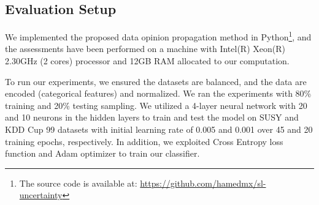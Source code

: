 \subsection{Evaluation Setup}
We implemented the proposed data opinion propagation method in Python\footnote{The source code is available at: \url{https://github.com/hamedmx/sl-uncertainty}}, and the assessments have been performed on a machine with Intel(R) Xeon(R) 2.30GHz (2 cores) processor and 12GB RAM allocated to our computation. 

To run our experiments, we ensured the datasets are balanced, and the data are encoded (categorical features) and normalized. We ran the experiments with 80\% training and 20\% testing sampling. We utilized a 4-layer neural network with 20 and 10 neurons in the hidden layers to train and test the model on SUSY and KDD Cup 99 datasets with initial learning rate of 0.005 and 0.001 over 45 and 20 training epochs, respectively. In addition, we exploited Cross Entropy loss function and Adam optimizer to train our classifier. 

